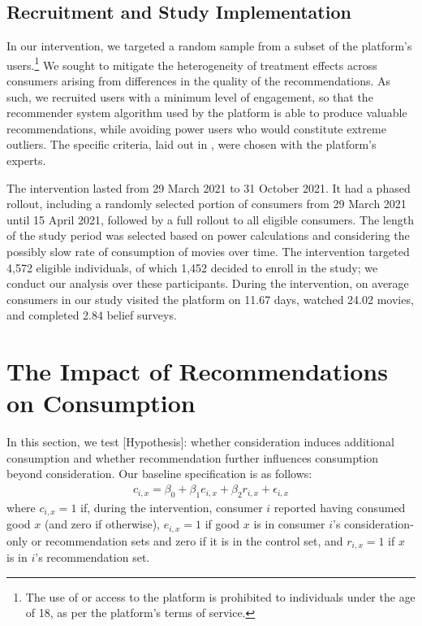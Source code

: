 \documentclass[12pt]{article}
\theoremstyle{newtheorem}
\begin{document}
\subsection{Recruitment and Study Implementation}
\label{section:design:other-details:recruitment}

In our intervention, we targeted a random sample from a subset of the platform's users.\footnote{
    The use of or access to the platform is prohibited to individuals under the age of 18, as per the platform's terms of service.
}
We sought to mitigate the heterogeneity of treatment effects across consumers arising from differences in the quality of the recommendations.
As such, we recruited users with a minimum level of engagement, so that the recommender system algorithm used by the platform is able to produce valuable recommendations, while avoiding power users who would constitute extreme outliers. 
The specific criteria, laid out in , were chosen with the platform's experts.


The intervention lasted from 29 March 2021 to 31 October 2021. 
It had a phased rollout, including a randomly selected portion of consumers from 29 March 2021 until 15 April 2021, followed by a full rollout to all eligible consumers.
The length of the study period was selected based on power calculations and considering the possibly slow rate of consumption of movies over time.
The intervention targeted 4,572 eligible individuals, of which 1,452 decided to enroll in the study; we conduct our analysis over these participants. 
During the intervention, on average consumers in our study visited the platform on 11.67 days, watched 24.02 movies, and completed 2.84 belief surveys. 



\section{The Impact of Recommendations on Consumption}
\label{section:consumption-on-rec}

In this section, we test [Hypothesis]: whether consideration induces additional consumption and whether recommendation further influences consumption beyond consideration.
Our baseline specification is as follows:
\begin{align}
    \label{equation:direct-rec-on-consumption1}
    c_{i,x} = \beta_0 + \beta_1 e_{i,x} + \beta_2 r_{i,x} + \epsilon_{i,x} 
\end{align}
\noindent 
where $c_{i,x}=1$ if, during the intervention, consumer $i$ reported having consumed good $x$ (and zero if otherwise), $e_{i,x}=1$ if good $x$ is in consumer $i$'s consideration-only or recommendation sets and zero if it is in the control set, and $r_{i,x}=1$ if $x$ is in $i$'s recommendation set.
\end{document}
